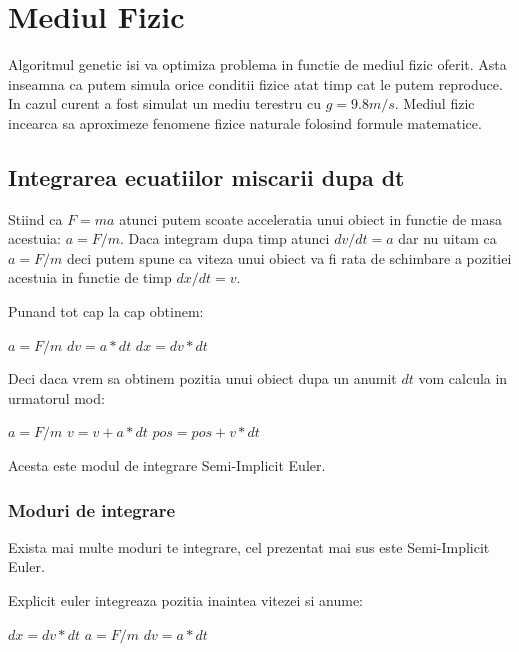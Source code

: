 \chapter{Mediul Fizic}
Algoritmul genetic isi va optimiza problema in functie de mediul fizic oferit. Asta inseamna ca putem simula orice conditii fizice atat timp cat le putem reproduce. In cazul curent a fost simulat un mediu terestru cu $g = 9.8 m/s$. Mediul fizic incearca sa aproximeze fenomene fizice naturale folosind formule matematice.

\section{Integrarea ecuatiilor miscarii dupa dt}

Stiind ca $F=ma$ atunci putem scoate acceleratia unui obiect in functie de masa acestuia: $a = F/m$. Daca integram dupa timp atunci $dv/dt = a$ dar nu uitam ca $a=F/m$ deci putem spune ca viteza unui obiect va fi rata de schimbare a pozitiei acestuia in functie de timp $dx/dt = v$.

Punand tot cap la cap obtinem:
\begin{center}
    $a = F / m$\linebreak
    $dv = a * dt$\linebreak
    $dx = dv * dt$\linebreak
\end{center}

Deci daca vrem sa obtinem pozitia unui obiect dupa un anumit $dt$ vom calcula in urmatorul mod:
\begin{center}
    $a = F / m$\linebreak
    $v = v + a * dt$\linebreak
    $pos = pos + v * dt$\linebreak
\end{center}

Acesta este modul de integrare Semi-Implicit Euler.

\subsection{Moduri de integrare}
Exista mai multe moduri te integrare, cel prezentat mai sus este Semi-Implicit Euler.

Explicit euler integreaza pozitia inaintea vitezei si anume: 
\begin{center}
    $dx = dv * dt$\linebreak
    $a = F / m$\linebreak
    $dv = a * dt$\linebreak
\end{center}

